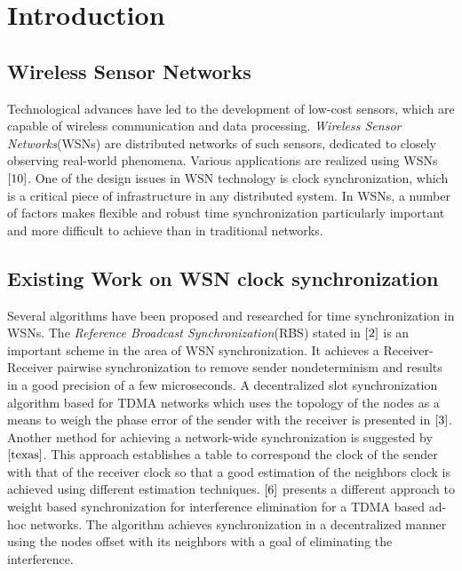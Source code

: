 \documentclass[journal]{IEEEtran}
\begin{document}
\section{\textbf{Introduction}}

\subsection{\textbf{Wireless Sensor Networks}}
\noindent Technological advances have led to the development of
low-cost sensors, which are capable of wireless communication and
data processing. \textit{Wireless Sensor Networks}(WSNs) are
distributed networks of such sensors, dedicated to closely observing
real-world phenomena. Various applications are realized using WSNs$\cite{10}$.
\newline One of the design issues in WSN technology is clock
synchronization, which is a critical piece of infrastructure in any
distributed system. In WSNs, a number of factors makes
flexible and robust time synchronization particularly important and
more difficult to achieve than in traditional networks.

\subsection{\textbf{Existing Work on WSN clock synchronization}}
\noindent Several algorithms have been proposed
and researched for time synchronization in WSNs. The
\textit{Reference Broadcast Synchronization}(RBS) stated in
$\cite{2}$ is an important scheme in the area of WSN
synchronization. It achieves a Receiver-Receiver pairwise
synchronization to remove sender nondeterminism and results in a
good precision of a few microseconds. A decentralized slot synchronization algorithm based for
TDMA networks which uses the topology of the nodes as a means to
weigh the phase error of the sender with the receiver is presented in $\cite{3}$.
\newline
Another method for achieving a network-wide synchronization is
suggested by $\cite{texas}$. This approach establishes a table to
correspond the clock of the sender with that of the receiver clock so
that a good estimation of the neighbors clock is achieved using different estimation
techniques. $\cite{6}$ presents a different approach to weight based synchronization for
interference elimination for a TDMA based ad-hoc networks. The algorithm
achieves synchronization in a decentralized manner using the nodes offset with its
neighbors with a goal of eliminating the interference.
\end{document}
